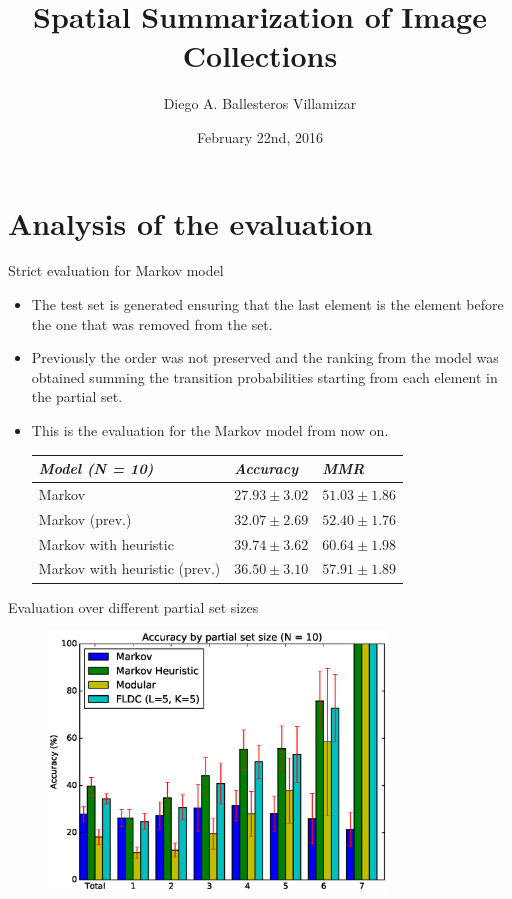 \documentclass{beamer}
\title[M.Sc. Thesis 2015]{Spatial Summarization of Image Collections}
\author{Diego A. Ballesteros Villamizar}
\institute[ETHZ]{ETH Zürich}
\date{February 22nd, 2016}
\begin{document}
\begin{frame}
  \titlepage
\end{frame}

\section{Analysis of the evaluation}

\begin{frame}{Strict evaluation for Markov model}
  \begin{itemize}
    \item The test set is generated ensuring that the last element is the element before the one that was removed from the set.
    \item Previously the order was not preserved and the ranking from the model was obtained summing the transition probabilities starting from each element in the partial set.
    \item This is the evaluation for the Markov model from now on.
      \begin{table}
        \begin{tabular}{@{}lll@{}}
          \hline
          \textit{Model (N = 10)} & \textit{Accuracy} & \textit{MMR} \\
          \hline
          Markov & $27.93 \pm 3.02$ & $51.03 \pm 1.86$ \\
          Markov (prev.) & $32.07 \pm 2.69$ & $52.40 \pm 1.76$ \\
          Markov with heuristic & $39.74 \pm 3.62$ & $60.64 \pm 1.98$ \\
          Markov with heuristic (prev.) & $36.50 \pm 3.10$ & $57.91 \pm 1.89$ \\
          \hline
        \end{tabular}
      \end{table}
  \end{itemize}
\end{frame}

\begin{frame}{Evaluation over different partial set sizes}
  \begin{figure}
    \centering
    \includegraphics[width=0.8\textwidth]{set_size_score_10}
  \end{figure}
\end{frame}
\end{document}
